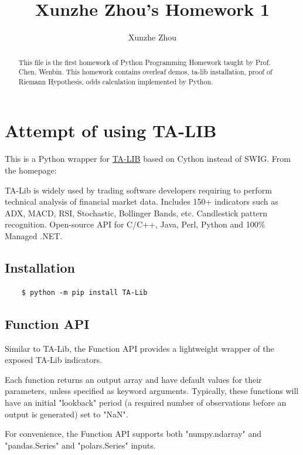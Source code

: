 \documentclass{article}
\title{Xunzhe Zhou's Homework 1}
\author{Xunzhe Zhou}
\begin{document}
\maketitle

\begin{abstract}
This file is the first homework of Python Programming Homework taught by Prof. Chen, Wenbin. This homework contains overleaf demos, ta-lib installation, proof of Riemann Hypothesis, odds calculation implemented by Python.
\end{abstract}

\section{Attempt of using TA-LIB}

This is a Python wrapper for \href{http://ta-lib.org}{TA-LIB} based on Cython
instead of SWIG. From the homepage:

TA-Lib is widely used by trading software developers requiring to perform technical analysis of financial market data. Includes 150+ indicators such as ADX, MACD, RSI, Stochastic, Bollinger Bands, etc. Candlestick pattern recognition. Open-source API for C/C++, Java, Perl, Python and 100\% Managed .NET.

\subsection{Installation}

\begin{verbatim}
    $ python -m pip install TA-Lib
\end{verbatim}

\subsection{Function API}

Similar to TA-Lib, the Function API provides a lightweight wrapper of the
exposed TA-Lib indicators.

Each function returns an output array and have default values for their
parameters, unless specified as keyword arguments. Typically, these functions
will have an initial "lookback" period (a required number of observations
before an output is generated) set to "NaN".

For convenience, the Function API supports both "numpy.ndarray" and
"pandas.Series" and "polars.Series" inputs.
\end{document}
